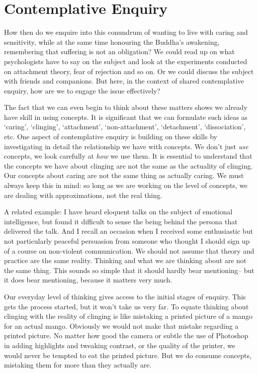 \section{Contemplative Enquiry}

How then do we enquire into this conundrum of wanting to live with
caring and sensitivity, while at the same time honouring the Buddha’s
awakening, remembering that suffering is not an obligation? We could
read up on what psychologists have to say on the subject and look at the
experiments conducted on attachment theory, fear of rejection and so on.
Or we could discuss the subject with friends and companions. But here,
in the context of shared contemplative enquiry, how are we to engage the
issue effectively?

The fact that we can even begin to think about these matters shows we
already have skill in using concepts. It is significant that we can
formulate such ideas as ‘caring’, ‘clinging’, ‘attachment’,
‘non-attachment’, ‘detachment’, ‘dissociation’, etc. One aspect of
contemplative enquiry is building on these skills by investigating in
detail the relationship we have with concepts. We don’t just \emph{use}
concepts, we look carefully at \emph{how} we use them. It is essential to
understand that the concepts we have about clinging are not the same as
the actuality of clinging. Our concepts about caring are not the same
thing as actually caring. We must always keep this in mind: so long as
we are working on the level of concepts, we are dealing with
approximations, not the real thing.

A related example: I have heard eloquent talks on the subject of
emotional intelligence, but found it difficult to sense the being behind
the persona that delivered the talk. And I recall an occasion when I
received some enthusiastic but not particularly peaceful persuasion from
someone who thought I should sign up of a course on non-violent
communication. We should not assume that theory and practice are the
same reality. Thinking and what we are thinking about are not the same
thing. This sounds so simple that it should hardly bear mentioning– but
it does bear mentioning, because it matters very much.

Our everyday level of thinking gives access to the initial stages of
enquiry. This gets the process started, but it won’t take us very far.
To equate thinking about clinging with the reality of clinging is like
mistaking a printed picture of a mango for an actual mango. Obviously we
would not make that mistake regarding a printed picture. No matter how
good the camera or subtle the use of Photoshop in adding highlights and
tweaking contrast, or the quality of the printer, we would never be
tempted to eat the printed picture. But we do consume concepts,
mistaking them for more than they actually are.

